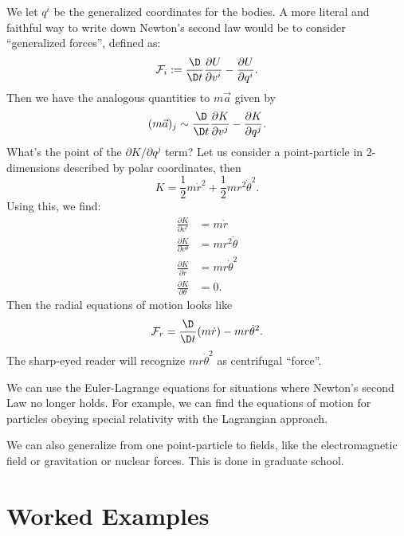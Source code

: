 We let $q^{i}$ be the generalized coordinates for the bodies. A more
literal and faithful way to write down Newton's second law would be to
consider ``generalized forces'', defined as:
\begin{equation}
\mathcal{F}_{i} := \frac{\D}{\D t}\frac{\partial U}{\partial v^{i}}
- \frac{\partial U}{\partial q^{i}}.
\end{equation}
Then we have the analogous quantities to $m\vec{a}$ given by
\begin{equation}
(m\vec{a})_{j} \sim \frac{\D}{\D t}\frac{\partial K}{\partial v^{j}} - 
\frac{\partial K}{\partial q^{j}}.
\end{equation}
What's the point of the $\partial K/\partial q^{j}$ term? Let us
consider a point-particle in 2-dimensions described by polar
coordinates, then
\begin{equation}
K = \frac{1}{2}m\dot{r}^{2} + \frac{1}{2}mr^{2}\dot{\theta}^{2}.
\end{equation}
Using this, we find:
\begin{subequations}
\begin{align}
\frac{\partial K}{\partial v^{r}} &= m\dot{r}\\
\frac{\partial K}{\partial v^{\theta}} &= mr^{2}\dot{\theta}\\
\frac{\partial K}{\partial r} &= mr\dot{\theta}^{2}\\
\frac{\partial K}{\partial \theta} &= 0.
\end{align}
\end{subequations}
Then the radial equations of motion looks like
\begin{equation}
\mathcal{F}_{r} = \frac{\D}{\D t}(m\dot{r}) - mr\dot{\theta}^{2}.
\end{equation}
The sharp-eyed reader will recognize $mr\dot{\theta}^{2}$ as centrifugal
``force''.

We can use the Euler-Lagrange equations for situations where Newton's
second Law no longer holds. For example, we can find the equations of
motion for particles obeying special relativity with the Lagrangian
approach.

We can also generalize from one point-particle to fields, like the
electromagnetic field or gravitation or nuclear forces. This is done in
graduate school.

\section{Worked Examples}

